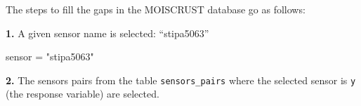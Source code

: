 \documentclass[]{article}
\newenvironment{Shaded}{\begin{snugshade}}{\end{snugshade}}
\newcommand{\KeywordTok}[1]{\textcolor[rgb]{0.13,0.29,0.53}{\textbf{#1}}}
\newcommand{\NormalTok}[1]{#1}
\newcommand{\OperatorTok}[1]{\textcolor[rgb]{0.81,0.36,0.00}{\textbf{#1}}}
\newcommand{\StringTok}[1]{\textcolor[rgb]{0.31,0.60,0.02}{#1}}
\begin{document}
The steps to fill the gaps in the MOISCRUST database go as follows:

\textbf{1.} A given sensor name is selected: ``stipa5063''

\begin{Shaded}
\begin{Highlighting}[]
\NormalTok{sensor =}\StringTok{ "stipa5063"}
\end{Highlighting}
\end{Shaded}

\textbf{2.} The sensors pairs from the table \texttt{sensors\_pairs}
where the selected sensor is \texttt{y} (the response variable) are
selected.

\begin{Shaded}
\end{Shaded}
\end{document}

